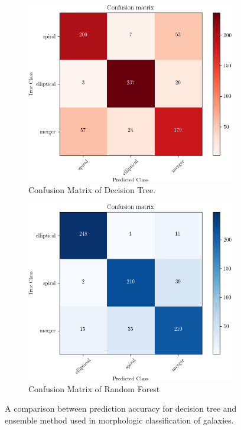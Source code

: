 \begin{figure}[H]
	\centering
	\begin{subfigure}{.5\linewidth}
		\centering
		\includegraphics[width=\linewidth, keepaspectratio]{images/misc/confusion_matrix.png}
		\caption{Confusion Matrix of Decision Tree.}
		\label{fig:sub1}
	\end{subfigure}%
	\begin{subfigure}{.5\linewidth}
		\centering
		\includegraphics[width=\linewidth, keepaspectratio]{images/misc/rf_cm.png}
		\caption{Confusion Matrix of Random Forest}
		\label{fig:sub2}
	\end{subfigure}
	\caption{A comparison between prediction accuracy for decision tree and ensemble method used in morphologic classification of galaxies.}
	\label{fig:test}
\end{figure}

